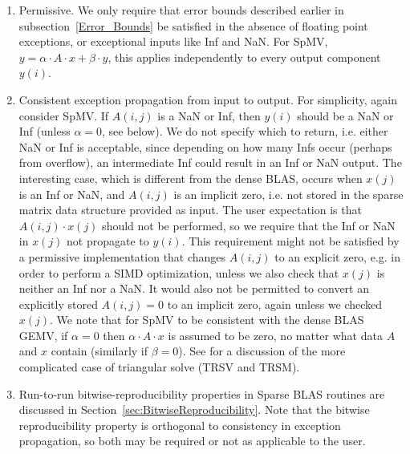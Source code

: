 \documentclass{article}
\begin{document}
\begin{enumerate}
    \item Permissive. We only require that error bounds described earlier in subsection~\ref{Error_Bounds} be satisfied in the absence of floating point exceptions, or exceptional inputs like Inf and NaN. For SpMV, $y = \alpha \cdot A \cdot x + \beta \cdot y$, this applies independently to every output component $y(i)$.
    \item Consistent exception propagation from input to output. For simplicity, again consider SpMV. If $A(i,j)$ is a NaN or Inf, then $y(i)$ should be a NaN or Inf
    (unless $\alpha = 0$, see below). We do not specify which to return, i.e. either NaN or Inf is acceptable, since depending on how many Infs occur (perhaps from overflow), an intermediate Inf could result in an Inf or NaN output. The interesting case, which is different from the dense BLAS, occurs when $x(j)$ is an Inf or NaN, and $A(i,j)$ is an implicit zero, i.e. not stored in the sparse matrix data structure provided as input. The user expectation is that $A(i,j) \cdot x(j)$ should not be performed, so we require that the Inf or NaN in $x(j)$ not propagate to $y(i)$. This requirement might not be satisfied by a permissive implementation that changes $A(i,j)$ to an explicit zero, e.g. in order to perform a SIMD optimization, unless we also check that $x(j)$ is neither an Inf nor a NaN. It would also not be permitted to convert an explicitly stored $A(i,j)=0$ to an implicit zero, again unless we checked $x(j)$. We note that for SpMV to be consistent with the dense BLAS GEMV, if $\alpha = 0$ then $\alpha \cdot A \cdot x$ is assumed to be zero, no matter what data $A$ and $x$ contain (similarly if $\beta=0$).
    See \cite{Proposed_BLAS_LAPACK_exception_handling} for a discussion of the
    more complicated case of triangular solve (TRSV and TRSM).

    \item Run-to-run bitwise-reproducibility properties in Sparse BLAS routines are discussed in Section~\ref{sec:BitwiseReproducibility}. Note that the bitwise reproducibility property is orthogonal to consistency in exception propagation, so both may be required or not as applicable to the user.
\end{enumerate}
\end{document}
